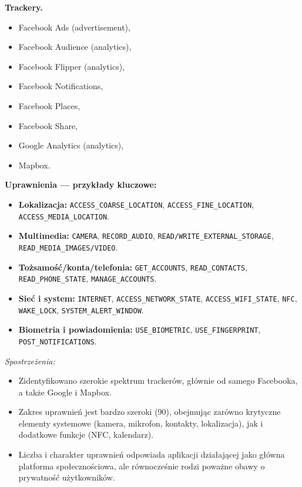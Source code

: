 \textbf{Trackery.}
\begin{itemize}
  \item Facebook Ads (advertisement),
  \item Facebook Audience (analytics),
  \item Facebook Flipper (analytics),
  \item Facebook Notifications,
  \item Facebook Places,
  \item Facebook Share,
  \item Google Analytics (analytics),
  \item Mapbox.
\end{itemize}

\textbf{Uprawnienia — przykłady kluczowe:}
\begin{itemize}
  \item \textbf{Lokalizacja:} \texttt{ACCESS\_COARSE\_LOCATION}, \texttt{ACCESS\_FINE\_LOCATION}, \texttt{ACCESS\_MEDIA\_LOCATION}.
  \item \textbf{Multimedia:} \texttt{CAMERA}, \texttt{RECORD\_AUDIO}, \texttt{READ/WRITE\_EXTERNAL\_STORAGE}, \texttt{READ\_MEDIA\_IMAGES/VIDEO}.
  \item \textbf{Tożsamość/konta/telefonia:} \texttt{GET\_ACCOUNTS}, \texttt{READ\_CONTACTS}, \texttt{READ\_PHONE\_STATE}, \texttt{MANAGE\_ACCOUNTS}.
  \item \textbf{Sieć i system:} \texttt{INTERNET}, \texttt{ACCESS\_NETWORK\_STATE}, \texttt{ACCESS\_WIFI\_STATE}, \texttt{NFC}, \texttt{WAKE\_LOCK}, \texttt{SYSTEM\_ALERT\_WINDOW}.
  \item \textbf{Biometria i powiadomienia:} \texttt{USE\_BIOMETRIC}, \texttt{USE\_FINGERPRINT}, \texttt{POST\_NOTIFICATIONS}.
\end{itemize}

\emph{Spostrzeżenia:} 
\begin{itemize}
  \item Zidentyfikowano szerokie spektrum trackerów, głównie od samego Facebooka, a także Google i Mapbox.
  \item Zakres uprawnień jest bardzo szeroki (90), obejmując zarówno krytyczne elementy systemowe (kamera, mikrofon, kontakty, lokalizacja), jak i dodatkowe funkcje (NFC, kalendarz).
  \item Liczba i charakter uprawnień odpowiada aplikacji działającej jako główna platforma społecznościowa, ale równocześnie rodzi poważne obawy o prywatność użytkowników.
\end{itemize}

